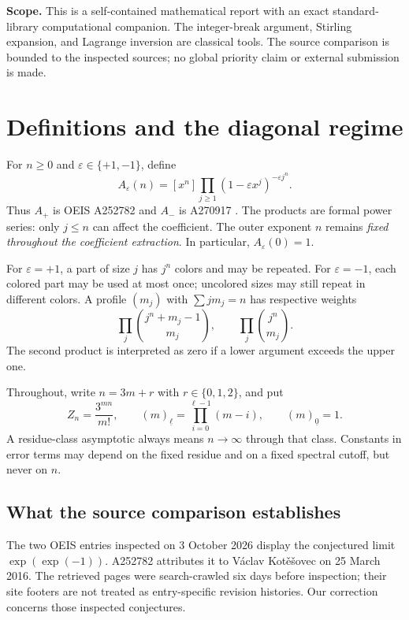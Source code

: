 \documentclass[11pt,letterpaper]{article}
\numberwithin{equation}{section}
\theoremstyle{definition}\newtheorem{definition}[theorem]{Definition}
\theoremstyle{remark}\newtheorem{remark}[theorem]{Remark}
\newcommand{\fall}[2]{(#1)_{\underline{#2}}}
\newcommand{\eps}{\varepsilon}
\newcommand{\coef}[2]{[#1^{#2}]}
\begin{document}
\noindent\textbf{Scope.} This is a self-contained mathematical report with an exact
standard-library computational companion. The integer-break argument,
Stirling expansion, and Lagrange inversion are classical tools. The
source comparison is bounded to the inspected sources; no global priority
claim or external submission is made.
\medskip

\section{Definitions and the diagonal regime}
For $n\geq0$ and $\eps\in\{+1,-1\}$, define
\begin{equation}\label{det:dia:eq:def}
 A_\eps(n)=\coef{x}{n}\prod_{j\geq1}
 (1-\eps x^j)^{-\eps j^n}.
\end{equation}
Thus $A_+$ is OEIS A252782 and $A_-$ is A270917
\cite{oeisplus,oeisminus}. The products are formal power series: only
$j\leq n$ can affect the coefficient. The outer exponent $n$ remains
\emph{fixed throughout the coefficient extraction}. In particular,
$A_\eps(0)=1$.

For $\eps=+1$, a part of size $j$ has $j^n$ colors and may be repeated.
For $\eps=-1$, each colored part may be used at most once; uncolored
sizes may still repeat in different colors. A profile $(m_j)$ with
$\sum jm_j=n$ has respective weights
\begin{equation}\label{det:dia:eq:profiles}
 \prod_j\binom{j^n+m_j-1}{m_j},\qquad
 \prod_j\binom{j^n}{m_j}.
\end{equation}
The second product is interpreted as zero if a lower argument exceeds
the upper one.

Throughout, write $n=3m+r$ with $r\in\{0,1,2\}$, and put
\begin{equation}\label{det:dia:eq:Z}
 Z_n=\frac{3^{mn}}{m!},\qquad
 \fall{m}{\ell}=\prod_{i=0}^{\ell-1}(m-i),\qquad
 \fall{m}{0}=1.
\end{equation}
A residue-class asymptotic always means $n\to\infty$ through that class.
Constants in error terms may depend on the fixed residue and on a fixed
spectral cutoff, but never on $n$.

\subsection{What the source comparison establishes}
The two OEIS entries inspected on 3 October 2026 display the conjectured
limit $\exp(\exp(-1))$. A252782 attributes it to V\'aclav Kot\v e\v sovec
on 25 March 2016. The retrieved pages were search-crawled six days before
inspection; their site footers are not treated as entry-specific revision
histories. Our correction concerns those inspected conjectures.
\end{document}
